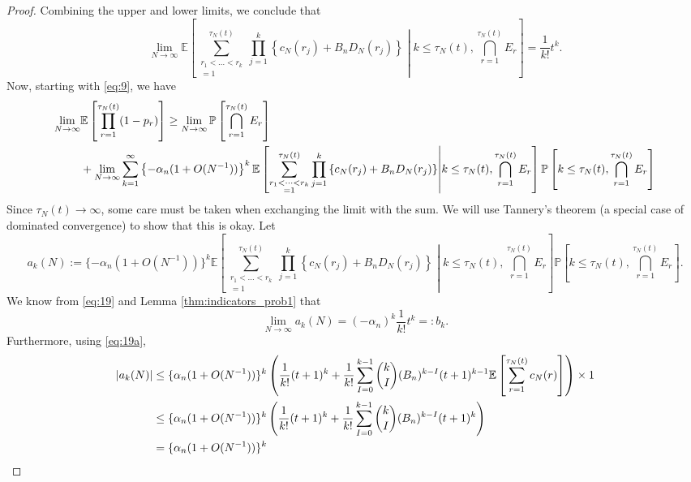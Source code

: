 \documentclass{article}
\newcommand{\Prob}{\mathbb{P}}
\newcommand{\E}{\mathbb{E}}
\newcommand{\1}[1]{\mathbbm{1}_{#1}}
\begin{document}
\begin{proof}
Combining the upper and lower limits, we conclude that
\begin{equation}\label{eq:19}
\lim_{N\to\infty} \E \left[ \sum_{\substack{r_1<\dots<r_k \\ =1}}^{\tau_N(t)}\prod_{j=1}^k 
\left\{ c_N(r_j) + B_n D_N(r_j) \right\} 
\middle| k\leq\tau_N(t), \bigcap_{r=1}^{\tau_N(t)} E_r \right]
= \frac{1}{k!} t^k .
\end{equation}
Now, starting with \eqref{eq:9}, we have
\begin{align}\label{eq:21a}
\lim_{N\to\infty} &\E \left[ \prod_{r=1}^{\tau_N(t)} (1-p_r) \right]
\geq \lim_{N\to\infty} \Prob \left[ \bigcap_{r=1}^{\tau_N(t)} E_r \right] \notag\\
&+ \lim_{N\to\infty} \sum_{k=1}^\infty \left\{ -\alpha_n (1+ O(N^{-1})) \right\}^k 
\E \left[ \sum_{\substack{r_1<\dots<r_k \\ =1}}^{\tau_N(t)}\prod_{j=1}^k 
\left\{ c_N(r_j) + B_n D_N(r_j) \right\} \middle| k\leq\tau_N(t), \bigcap_{r=1}^{\tau_N(t)} E_r \right]
\Prob \left[ k \leq \tau_N(t) , \bigcap_{r=1}^{\tau_N(t)} E_r \right]
\end{align}
Since $\tau_N(t) \to \infty$, some care must be taken when exchanging the limit with the sum. We will use Tannery's theorem (a special case of dominated convergence) to show that this is okay.
Let 
\begin{equation}
a_k(N) := \{ -\alpha_n (1+ O(N^{-1})) \}^k 
\E \left[ \sum_{\substack{r_1<\dots<r_k \\ =1}}^{\tau_N(t)}\prod_{j=1}^k 
\left\{ c_N(r_j) + B_n D_N(r_j) \right\} \middle| k\leq\tau_N(t), \bigcap_{r=1}^{\tau_N(t)} E_r \right]
\Prob \left[ k \leq \tau_N(t) , \bigcap_{r=1}^{\tau_N(t)} E_r \right] .
\end{equation}
We know from \eqref{eq:19} and Lemma \ref{thm:indicators_prob1} that
\begin{equation}
\lim_{N\to\infty} a_k(N) = (-\alpha_n)^k \frac{1}{k!}t^k =: b_k.
\end{equation}
Furthermore, using \eqref{eq:19a},
\begin{align}
|a_k(N)| 
&\leq \{ \alpha_n (1+ O(N^{-1})) \}^k 
\left( \frac{1}{k!} (t+1)^k + \frac{1}{k!} \sum_{I=0}^{k-1} \binom{k}{I} (B_n)^{k-I} (t+1)^{k-1} \E \left[ \sum_{r=1}^{\tau_N(t)} c_N(r) \right] \right) \times 1 \notag\\
&\leq \{ \alpha_n (1+ O(N^{-1})) \}^k 
\left( \frac{1}{k!} (t+1)^k + \frac{1}{k!} \sum_{I=0}^{k-1} \binom{k}{I} (B_n)^{k-I} (t+1)^k \right) \notag\\
&= \{ \alpha_n (1+ O(N^{-1})) \}^k 

\end{align}
\end{proof}
\end{document}

